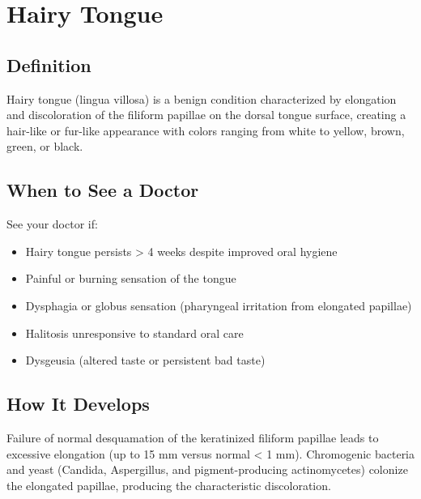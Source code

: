 \chapter{Hairy Tongue}

\section*{Definition}
Hairy tongue (lingua villosa) is a benign condition characterized by elongation and discoloration of the filiform papillae on the dorsal tongue surface, creating a hair-like or fur-like appearance with colors ranging from white to yellow, brown, green, or black.

\section*{When to See a Doctor}
See your doctor if:
\begin{itemize}
  \item Hairy tongue persists > 4 weeks despite improved oral hygiene
  \item Painful or burning sensation of the tongue
  \item Dysphagia or globus sensation (pharyngeal irritation from elongated papillae)
  \item Halitosis unresponsive to standard oral care
  \item Dysgeusia (altered taste or persistent bad taste)
\end{itemize}

\section*{How It Develops}
Failure of normal desquamation of the keratinized filiform papillae leads to excessive elongation (up to 15 mm versus normal < 1 mm). Chromogenic bacteria and yeast (Candida, Aspergillus, and pigment-producing actinomycetes) colonize the elongated papillae, producing the characteristic discoloration.

